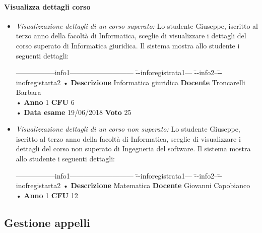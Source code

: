 \paragraph{Visualizza dettagli corso}
\begin{itemize}
	\item \textit{Visualizzazione dettagli di un corso superato:}
	Lo studente Giuseppe, iscritto al terzo anno della facoltà di Informatica, sceglie di visualizzare i dettagli del corso superato di Informatica giuridica. Il sistema mostra allo studente i seguenti dettagli:
	\begin{tabbing}
		\hspace{1cm}-----------------info1--------------------------- \= --inforegistrata1--- \= --info2--\=--inofregistarta2 \kill
		\hspace{1cm} • \textbf{Descrizione} Informatica giuridica \> \textbf{Docente} Troncarelli Barbara\\
		\hspace{1cm} • \textbf{Anno} 1 \> \textbf{CFU} 6   \\
		\hspace{1cm} • \textbf{Data esame} 19/06/2018 \> \textbf{Voto} 25 \\
	\end{tabbing}

	\item \textit{Visualizzazione dettagli di un corso non superato:}
	Lo studente Giuseppe, iscritto al terzo anno della facoltà di Informatica, sceglie di visualizzare i dettagli del corso non superato di Ingegneria del software. Il sistema mostra allo studente i seguenti dettagli:
	\begin{tabbing}
		\hspace{1cm}-----------------info1--------------------------- \= --inforegistrata1--- \= --info2--\=--inofregistarta2 \kill
		\hspace{1cm} • \textbf{Descrizione} Matematica \> \textbf{Docente} Giovanni  Capobianco\\
		\hspace{1cm} • \textbf{Anno} 1 \> \textbf{CFU} 12  \\
	\end{tabbing}
\end{itemize}

\subsection{Gestione appelli}
